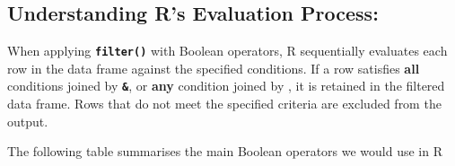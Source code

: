 \documentclass[
]{book}
\begin{document}
\hypertarget{understanding-rs-evaluation-process}{%
\subsection{Understanding R's Evaluation Process:}\label{understanding-rs-evaluation-process}}

When applying \textbf{\texttt{filter()}} with Boolean operators, R sequentially evaluates each row in the data frame against the specified conditions. If a row satisfies \textbf{all} conditions joined by \textbf{\texttt{\&}}, or \textbf{any} condition joined by \textbf{\texttt{\textbar{}}}, it is retained in the filtered data frame. Rows that do not meet the specified criteria are excluded from the output.

The following table summarises the main Boolean operators we would use in R
\end{document}
